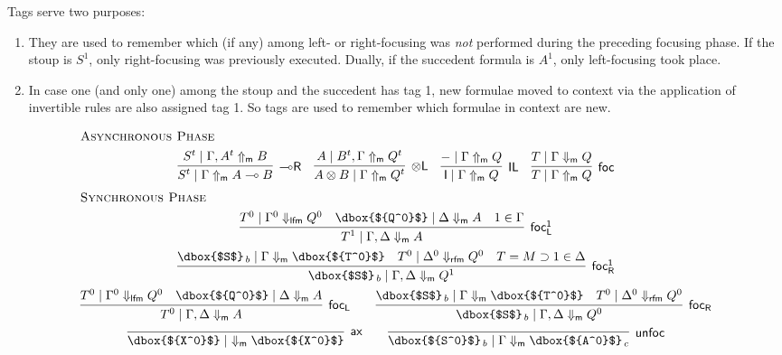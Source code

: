 \documentclass[runningheads]{llncs}
\newcommand{\tl}{\otimes \mathsf{L}}
\newcommand{\lright}{{\multimap}\mathsf{R}}
\newcommand{\unitl}{\mathsf{IL}}
\newcommand{\otL}{\tl}
\newcommand{\lolliR}{\lright}
\newcommand{\IL}{\unitl}
\newcommand{\ax}{\mathsf{ax}}
\newcommand{\ot}{\otimes}
\newcommand{\lolli}{\multimap}
\newcommand{\I}{\mathsf{I}}
\newcommand{\lfm}{\dn_\mathsf{lfm}}%
\newcommand{\rfm}{\dn_\mathsf{rfm}}%
\newcommand{\green}[1]{{#1^0}}
\newcommand{\dn}{\Downarrow}
\newcommand{\upm}{\Uparrow_{\mathsf{m}}}
\newcommand{\dnm}{\Downarrow_{\mathsf{m}}}
\newcommand{\foc}{\mathsf{foc}}
\newcommand{\focLgreen}{\mathsf{foc_L}}
\newcommand{\focLred}{\mathsf{foc_L^1}}
\newcommand{\focRred}{\mathsf{foc_R^1}}
\newcommand{\focRgreen}{\mathsf{foc_R}}
\newcommand{\unfoc}{\mathsf{unfoc}}
\begin{document}
Tags serve two purposes:
\begin{enumerate}
\item They are used to remember which (if any) among left- or right-focusing was \emph{not} performed during the preceding focusing phase. If the stoup is $S^1$, only right-focusing was previously executed. Dually, if the succedent formula is $A^1$, only left-focusing took place.
\item In case one (and only one) among the stoup and the succedent has tag 1, new formulae moved to context via the application of invertible rules are also assigned tag 1. So tags are used to remember which formulae in context are new.
\end{enumerate}
\begin{figure}[t]
  \[
  \begin{array}{c}
    \multicolumn{1}{l}{\text{\textsc{Asynchronous Phase}}} \\[4pt]
      \infer[\lolliR]{S^t \mid \Gamma \upm A \lolli B}{S^t \mid \Gamma , A^t \upm B}
    \quad
    \infer[\otL]{A \ot B \mid \Gamma \upm Q^t}{A\mid  B^t , \Gamma \upm Q^t}
    \quad
      \infer[\IL]{\I \mid \Gamma \upm Q}{- \mid \Gamma \upm Q}    
    \quad
        \infer[\foc]{T \mid \Gamma \upm Q}{
      T \mid \Gamma \dnm Q
    }
    \\[6pt]
    \multicolumn{1}{l}{\text{\textsc{Synchronous Phase}}} \\[4pt]
        \infer[\focLred]{T^1 \mid \Gamma , \Delta \dnm A}{
          \green{T} \mid \green{\Gamma} \lfm \green{Q} &
          \dbox{$\green{Q}$} \mid \Delta \dnm A
          & 1 \in \Gamma
        }
     \\[4pt]
    \infer[\focRred]{\dbox{$S$}_{\, b} \mid \Gamma,\Delta \dnm Q^1}{
      \dbox{$S$}_{\, b} \mid \Gamma \dnm \dbox{$\green{T}$}
      &
      \green{T} \mid \green{\Delta} \rfm \green{Q}
      & T = M \supset 1 \in \Delta
    }
    \\[4pt]
            \infer[\focLgreen]{\green{T} \mid \Gamma , \Delta \dnm A}{
          \green{T} \mid \green{\Gamma} \lfm \green{Q} &
          \dbox{$\green{Q}$} \mid \Delta \dnm A
        }\qquad
\infer[\focRgreen]{\dbox{$S$}_{\, b} \mid \Gamma,\Delta \dnm \green{Q}}{
      \dbox{$S$}_{\, b} \mid \Gamma \dnm \dbox{$\green{T}$}
      &
      \green{T} \mid \green{\Delta} \rfm \green{Q}
    }
    \\[4pt]
        \infer[\ax]{\dbox{$\green{X}$} \mid ~ \dnm \dbox{$\green{X}$}}{}
    \qquad
    \infer[\unfoc]{\dbox{$\green{S}$}_{\,b} \mid \Gamma \dnm \dbox{$\green{A}$}_{\,c}}{
}
\end{array}\]
\end{figure}
\end{document}
